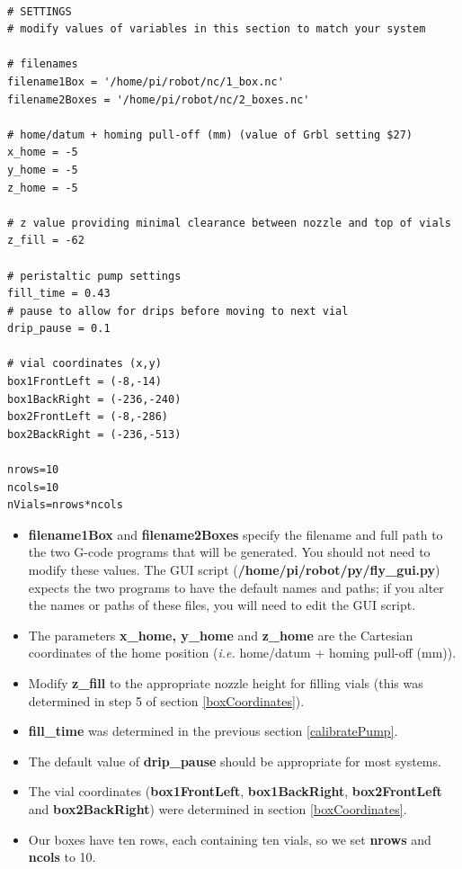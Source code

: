 \documentclass[
]{book}
\providecommand{\tightlist}{%
  \setlength{\itemsep}{0pt}\setlength{\parskip}{0pt}}
\begin{document}
\begin{verbatim}

# SETTINGS
# modify values of variables in this section to match your system

# filenames
filename1Box = '/home/pi/robot/nc/1_box.nc'
filename2Boxes = '/home/pi/robot/nc/2_boxes.nc'

# home/datum + homing pull-off (mm) (value of Grbl setting $27)
x_home = -5
y_home = -5
z_home = -5

# z value providing minimal clearance between nozzle and top of vials
z_fill = -62 

# peristaltic pump settings
fill_time = 0.43
# pause to allow for drips before moving to next vial
drip_pause = 0.1 

# vial coordinates (x,y)
box1FrontLeft = (-8,-14)
box1BackRight = (-236,-240)
box2FrontLeft = (-8,-286)
box2BackRight = (-236,-513)

nrows=10
ncols=10
nVials=nrows*ncols
\end{verbatim}

\begin{itemize}
\tightlist
\item
  \textbf{filename1Box} and \textbf{filename2Boxes} specify the filename and full path to the two G-code programs that will be generated. You should not need to modify these values. The GUI script (\textbf{/home/pi/robot/py/fly\_gui.py}) expects the two programs to have the default names and paths; if you alter the names or paths of these files, you will need to edit the GUI script.
\item
  The parameters \textbf{x\_home, y\_home} and \textbf{z\_home} are the Cartesian coordinates of the home position (\emph{i.e.} home/datum + homing pull-off (mm)).
\item
  Modify \textbf{z\_fill} to the appropriate nozzle height for filling vials (this was determined in step 5 of section \ref{boxCoordinates}).
\item
  \textbf{fill\_time} was determined in the previous section \ref{calibratePump}.
\item
  The default value of \textbf{drip\_pause} should be appropriate for most systems.
\item
  The vial coordinates (\textbf{box1FrontLeft}, \textbf{box1BackRight}, \textbf{box2FrontLeft} and \textbf{box2BackRight}) were determined in section \ref{boxCoordinates}.
\item
  Our boxes have ten rows, each containing ten vials, so we set \textbf{nrows} and \textbf{ncols} to 10.
\end{itemize}
\end{document}
